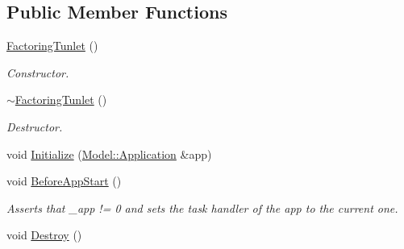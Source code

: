 \subsection*{Public Member Functions}
\begin{DoxyCompactItemize}
\item 
\hypertarget{class_factoring_tunlet_a5aab3bb67f4bd4eeec882d42f96a308c}{\hyperlink{class_factoring_tunlet_a5aab3bb67f4bd4eeec882d42f96a308c}{Factoring\-Tunlet} ()}\label{class_factoring_tunlet_a5aab3bb67f4bd4eeec882d42f96a308c}

\begin{DoxyCompactList}\small\item\em Constructor. \end{DoxyCompactList}\item 
\hypertarget{class_factoring_tunlet_a0b71dcf56237028c84570a91b86ef818}{\hyperlink{class_factoring_tunlet_a0b71dcf56237028c84570a91b86ef818}{$\sim$\-Factoring\-Tunlet} ()}\label{class_factoring_tunlet_a0b71dcf56237028c84570a91b86ef818}

\begin{DoxyCompactList}\small\item\em Destructor. \end{DoxyCompactList}\item 
void \hyperlink{class_factoring_tunlet_a4883ba0a05903fb09b9f420d72927d86}{Initialize} (\hyperlink{class_model_1_1_application}{Model\-::\-Application} \&app)
\item 
\hypertarget{class_factoring_tunlet_a72678a4eaea3f9559a542cf0ffa29e03}{void \hyperlink{class_factoring_tunlet_a72678a4eaea3f9559a542cf0ffa29e03}{Before\-App\-Start} ()}\label{class_factoring_tunlet_a72678a4eaea3f9559a542cf0ffa29e03}

\begin{DoxyCompactList}\small\item\em Asserts that \-\_\-app != 0 and sets the task handler of the app to the current one. \end{DoxyCompactList}\item 
\hypertarget{class_factoring_tunlet_a3604567541e57a0dfd59d44cac44ecd2}{void \hyperlink{class_factoring_tunlet_a3604567541e57a0dfd59d44cac44ecd2}{Destroy} ()}\label{class_factoring_tunlet_a3604567541e57a0dfd59d44cac44ecd2}


\end{DoxyCompactItemize}
